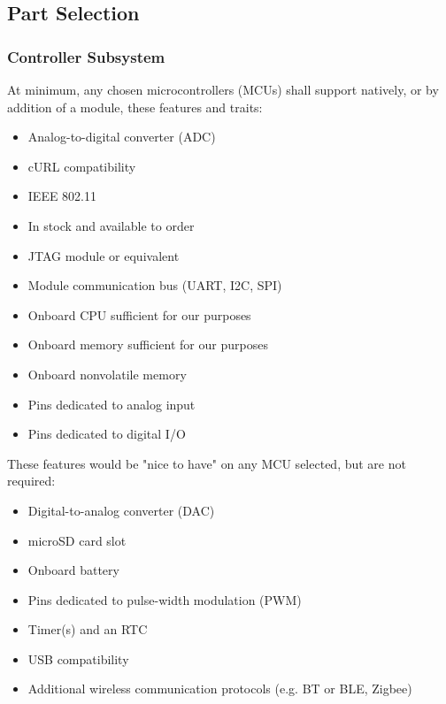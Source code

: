 \subsection{Part Selection}
\subsubsection{Controller Subsystem}
\begin{flushleft}
	At minimum, any chosen microcontrollers (MCUs) shall support natively, or by addition of a
	module, these features and traits:
	\begin{itemize}
		\item Analog-to-digital converter (ADC)
		\item cURL compatibility
		\item IEEE 802.11
		\item In stock and available to order
		\item JTAG module or equivalent
		\item Module communication bus (UART, I2C, SPI)
		\item Onboard CPU sufficient for our purposes
		\item Onboard memory sufficient for our purposes
		\item Onboard nonvolatile memory
		\item Pins dedicated to analog input
		\item Pins dedicated to digital I/O
	\end{itemize}
	These features would be "nice to have" on any MCU selected, but are not required:
	\begin{itemize}
		\item Digital-to-analog converter (DAC)
		\item microSD card slot
		\item Onboard battery
		\item Pins dedicated to pulse-width modulation (PWM)
		\item Timer(s) and an RTC
		\item USB compatibility
		\item Additional wireless communication protocols (e.g. BT or BLE, Zigbee)
	\end{itemize}
\end{flushleft}
